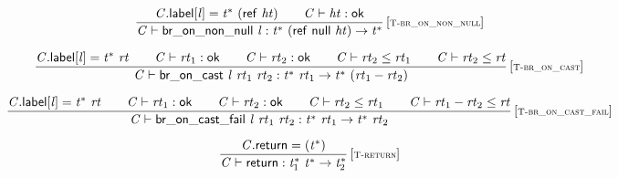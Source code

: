 $$
\begin{array}{@{}c@{}}\displaystyle
\frac{
{\mathit{C}}.\mathsf{label}[{\mathit{l}}] = {{\mathit{t}}^\ast}~(\mathsf{ref}~{\mathit{ht}})
 \qquad
{\mathit{C}} \vdash {\mathit{ht}} : \mathsf{ok}
}{
{\mathit{C}} \vdash \mathsf{br\_on\_non\_null}~{\mathit{l}} : {{\mathit{t}}^\ast}~(\mathsf{ref}~\mathsf{null}~{\mathit{ht}}) \rightarrow {{\mathit{t}}^\ast}
} \, {[\textsc{\scriptsize T{-}br\_on\_non\_null}]}
\qquad
\end{array}
$$

$$
\begin{array}{@{}c@{}}\displaystyle
\frac{
{\mathit{C}}.\mathsf{label}[{\mathit{l}}] = {{\mathit{t}}^\ast}~{\mathit{rt}}
 \qquad
{\mathit{C}} \vdash {\mathit{rt}}_{{1}} : \mathsf{ok}
 \qquad
{\mathit{C}} \vdash {\mathit{rt}}_{{2}} : \mathsf{ok}
 \qquad
{\mathit{C}} \vdash {\mathit{rt}}_{{2}} \leq {\mathit{rt}}_{{1}}
 \qquad
{\mathit{C}} \vdash {\mathit{rt}}_{{2}} \leq {\mathit{rt}}
}{
{\mathit{C}} \vdash \mathsf{br\_on\_cast}~{\mathit{l}}~{\mathit{rt}}_{{1}}~{\mathit{rt}}_{{2}} : {{\mathit{t}}^\ast}~{\mathit{rt}}_{{1}} \rightarrow {{\mathit{t}}^\ast}~({\mathit{rt}}_{{1}} - {\mathit{rt}}_{{2}})
} \, {[\textsc{\scriptsize T{-}br\_on\_cast}]}
\qquad
\end{array}
$$

$$
\begin{array}{@{}c@{}}\displaystyle
\frac{
{\mathit{C}}.\mathsf{label}[{\mathit{l}}] = {{\mathit{t}}^\ast}~{\mathit{rt}}
 \qquad
{\mathit{C}} \vdash {\mathit{rt}}_{{1}} : \mathsf{ok}
 \qquad
{\mathit{C}} \vdash {\mathit{rt}}_{{2}} : \mathsf{ok}
 \qquad
{\mathit{C}} \vdash {\mathit{rt}}_{{2}} \leq {\mathit{rt}}_{{1}}
 \qquad
{\mathit{C}} \vdash {\mathit{rt}}_{{1}} - {\mathit{rt}}_{{2}} \leq {\mathit{rt}}
}{
{\mathit{C}} \vdash \mathsf{br\_on\_cast\_fail}~{\mathit{l}}~{\mathit{rt}}_{{1}}~{\mathit{rt}}_{{2}} : {{\mathit{t}}^\ast}~{\mathit{rt}}_{{1}} \rightarrow {{\mathit{t}}^\ast}~{\mathit{rt}}_{{2}}
} \, {[\textsc{\scriptsize T{-}br\_on\_cast\_fail}]}
\qquad
\end{array}
$$

\vspace{1ex}

$$
\begin{array}{@{}c@{}}\displaystyle
\frac{
{\mathit{C}}.\mathsf{return} = ({{\mathit{t}}^\ast})
}{
{\mathit{C}} \vdash \mathsf{return} : {{\mathit{t}}_{{1}}^\ast}~{{\mathit{t}}^\ast} \rightarrow {{\mathit{t}}_{{2}}^\ast}
} \, {[\textsc{\scriptsize T{-}return}]}
\qquad
\end{array}
$$

